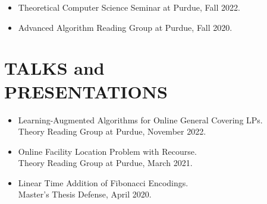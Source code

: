 \documentclass[margin, 10pt]{res} %
\begin{document}
\begin{resume}
\begin{itemize}
\item Theoretical Computer Science Seminar at Purdue, Fall 2022.
\item Advanced Algorithm Reading Group at Purdue, Fall 2020.
\end{itemize}

\section{TALKS and \\ PRESENTATIONS}
\begin{itemize}
\item Learning-Augmented Algorithms for Online General Covering LPs.\\
Theory Reading Group at Purdue, November 2022.
\item Online Facility Location Problem with Recourse.\\
Theory Reading Group at Purdue, March 2021.
\item Linear Time Addition of Fibonacci Encodings.\\
Master's Thesis Defense, April 2020.
\end{itemize}


\end{resume}
\end{document}
